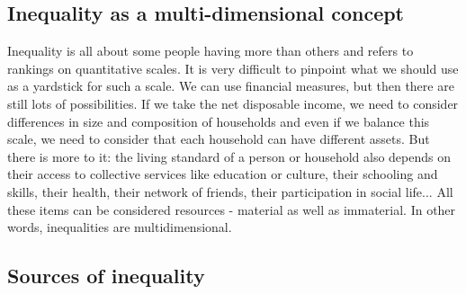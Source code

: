 \documentclass[../summary.tex]{subfiles}
\begin{document}
\subsection{Inequality as a multi-dimensional concept}

Inequality is all about some people having more than others and refers to rankings on quantitative scales. It is very difficult to pinpoint what we should use as a yardstick for such a scale. We can use financial measures, but then there are still lots of possibilities. If we take the net disposable income, we need to consider differences in size and composition of households and even if we balance this scale, we need to consider that each household can have different assets. But there is more to it: the living standard of a person or household also depends on their access to collective services like education or culture, their schooling and skills, their health, their network of friends, their participation in social life... All these items can be considered resources - material as well as immaterial. In other words, inequalities are multidimensional.

\subsection{Sources of inequality}
\end{document}
